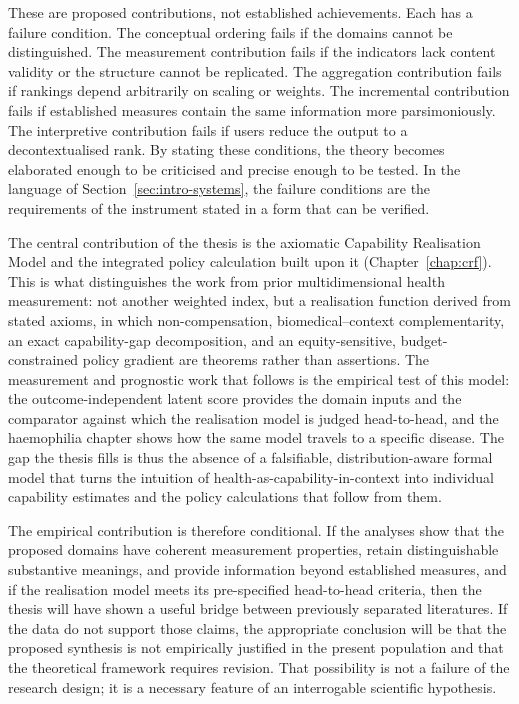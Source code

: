 These are proposed contributions, not established achievements. Each has a
failure condition. The conceptual ordering fails if the domains cannot be
distinguished. The measurement contribution fails if the indicators lack
content validity or the structure cannot be replicated. The aggregation
contribution fails if rankings depend arbitrarily on scaling or weights. The
incremental contribution fails if established measures contain the same
information more parsimoniously. The interpretive contribution fails if users
reduce the output to a decontextualised rank. By stating these conditions, the
theory becomes elaborated enough to be criticised and precise enough to be
tested. In the language of Section~\ref{sec:intro-systems}, the failure
conditions are the requirements of the instrument stated in a form that can be
verified.

The central contribution of the thesis is the axiomatic Capability Realisation Model and the integrated policy calculation built upon it (Chapter~\ref{chap:crf}). This is what distinguishes the work from prior multidimensional health measurement: not another weighted index, but a realisation function derived from stated axioms, in which non-compensation, biomedical--context complementarity, an exact capability-gap decomposition, and an equity-sensitive, budget-constrained policy gradient are theorems rather than assertions. The measurement and prognostic work that follows is the empirical test of this model: the outcome-independent latent score provides the domain inputs and the comparator against which the realisation model is judged head-to-head, and the haemophilia chapter shows how the same model travels to a specific disease. The gap the thesis fills is thus the absence of a falsifiable, distribution-aware formal model that turns the intuition of health-as-capability-in-context into individual capability estimates and the policy calculations that follow from them.

The empirical contribution is therefore conditional. If the analyses show that the proposed domains have coherent measurement properties, retain distinguishable substantive meanings, and provide information beyond established measures, and if the realisation model meets its pre-specified head-to-head criteria, then the thesis will have shown a useful bridge between previously separated literatures. If the data do not support those claims, the appropriate conclusion will be that the proposed synthesis is not empirically justified in the present population and that the theoretical framework requires revision. That possibility is not a failure of the research design; it is a necessary feature of an interrogable scientific hypothesis.

